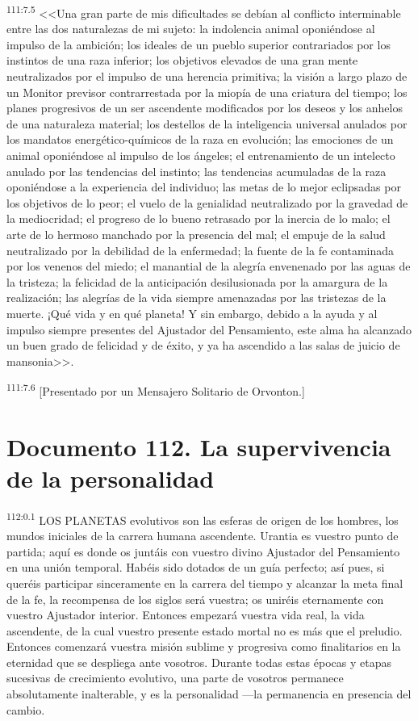 \documentclass[twoside, 11pt]{book}
\begin{document}
\par
\textsuperscript{111:7.5} <<Una gran parte de mis dificultades se debían al conflicto interminable entre las dos naturalezas de mi sujeto: la indolencia animal oponiéndose al impulso de la ambición; los ideales de un pueblo superior contrariados por los instintos de una raza inferior; los objetivos elevados de una gran mente neutralizados por el impulso de una herencia primitiva; la visión a largo plazo de un Monitor previsor contrarrestada por la miopía de una criatura del tiempo; los planes progresivos de un ser ascendente modificados por los deseos y los anhelos de una naturaleza material; los destellos de la inteligencia universal anulados por los mandatos energético-químicos de la raza en evolución; las emociones de un animal oponiéndose al impulso de los ángeles; el entrenamiento de un intelecto anulado por las tendencias del instinto; las tendencias acumuladas de la raza oponiéndose a la experiencia del individuo; las metas de lo mejor eclipsadas por los objetivos de lo peor; el vuelo de la genialidad neutralizado por la gravedad de la mediocridad; el progreso de lo bueno retrasado por la inercia de lo malo; el arte de lo hermoso manchado por la presencia del mal; el empuje de la salud neutralizado por la debilidad de la enfermedad; la fuente de la fe contaminada por los venenos del miedo; el manantial de la alegría envenenado por las aguas de la tristeza; la felicidad de la anticipación desilusionada por la amargura de la realización; las alegrías de la vida siempre amenazadas por las tristezas de la muerte. ¡Qué vida y en qué planeta! Y sin embargo, debido a la ayuda y al impulso siempre presentes del Ajustador del Pensamiento, este alma ha alcanzado un buen grado de felicidad y de éxito, y ya ha ascendido a las salas de juicio de mansonia>>.

\par
\textsuperscript{111:7.6} [Presentado por un Mensajero Solitario de Orvonton.]


\chapter{Documento 112. La supervivencia de la personalidad}
\par
\textsuperscript{112:0.1} LOS PLANETAS evolutivos son las esferas de origen de los hombres, los mundos iniciales de la carrera humana ascendente. Urantia es vuestro punto de partida; aquí es donde os juntáis con vuestro divino Ajustador del Pensamiento en una unión temporal. Habéis sido dotados de un guía perfecto; así pues, si queréis participar sinceramente en la carrera del tiempo y alcanzar la meta final de la fe, la recompensa de los siglos será vuestra; os uniréis eternamente con vuestro Ajustador interior. Entonces empezará vuestra vida real, la vida ascendente, de la cual vuestro presente estado mortal no es más que el preludio. Entonces comenzará vuestra misión sublime y progresiva como finalitarios en la eternidad que se despliega ante vosotros. Durante todas estas épocas y etapas sucesivas de crecimiento evolutivo, una parte de vosotros permanece absolutamente inalterable, y es la personalidad ---la permanencia en presencia del cambio.
\end{document}
